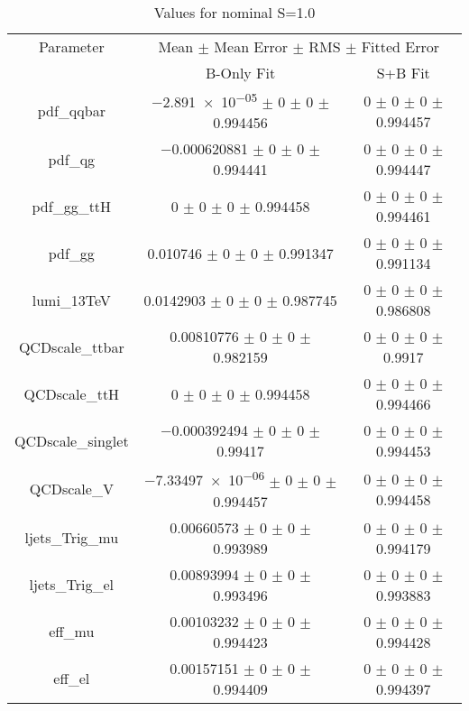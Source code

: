 \begin{table}
\centering
\caption{Values for nominal S=1.0}
\begin{tabular}{ccc}
\toprule
Parameter & \multicolumn{2}{c}{Mean $\pm$ Mean Error $\pm$ RMS $\pm$ Fitted Error}\\
 & B-Only Fit & S+B Fit\\
\midrule
pdf\_qqbar & \num{-2.891e-05} $\pm$ \num{0} $\pm$ \num{0} $\pm$ \num{0.994456} & \num{0} $\pm$ \num{0} $\pm$ \num{0} $\pm$ \num{0.994457}\\
pdf\_qg & \num{-0.000620881} $\pm$ \num{0} $\pm$ \num{0} $\pm$ \num{0.994441} & \num{0} $\pm$ \num{0} $\pm$ \num{0} $\pm$ \num{0.994447}\\
pdf\_gg\_ttH & \num{0} $\pm$ \num{0} $\pm$ \num{0} $\pm$ \num{0.994458} & \num{0} $\pm$ \num{0} $\pm$ \num{0} $\pm$ \num{0.994461}\\
pdf\_gg & \num{0.010746} $\pm$ \num{0} $\pm$ \num{0} $\pm$ \num{0.991347} & \num{0} $\pm$ \num{0} $\pm$ \num{0} $\pm$ \num{0.991134}\\
lumi\_13TeV & \num{0.0142903} $\pm$ \num{0} $\pm$ \num{0} $\pm$ \num{0.987745} & \num{0} $\pm$ \num{0} $\pm$ \num{0} $\pm$ \num{0.986808}\\
QCDscale\_ttbar & \num{0.00810776} $\pm$ \num{0} $\pm$ \num{0} $\pm$ \num{0.982159} & \num{0} $\pm$ \num{0} $\pm$ \num{0} $\pm$ \num{0.9917}\\
QCDscale\_ttH & \num{0} $\pm$ \num{0} $\pm$ \num{0} $\pm$ \num{0.994458} & \num{0} $\pm$ \num{0} $\pm$ \num{0} $\pm$ \num{0.994466}\\
QCDscale\_singlet & \num{-0.000392494} $\pm$ \num{0} $\pm$ \num{0} $\pm$ \num{0.99417} & \num{0} $\pm$ \num{0} $\pm$ \num{0} $\pm$ \num{0.994453}\\
QCDscale\_V & \num{-7.33497e-06} $\pm$ \num{0} $\pm$ \num{0} $\pm$ \num{0.994457} & \num{0} $\pm$ \num{0} $\pm$ \num{0} $\pm$ \num{0.994458}\\
ljets\_Trig\_mu & \num{0.00660573} $\pm$ \num{0} $\pm$ \num{0} $\pm$ \num{0.993989} & \num{0} $\pm$ \num{0} $\pm$ \num{0} $\pm$ \num{0.994179}\\
ljets\_Trig\_el & \num{0.00893994} $\pm$ \num{0} $\pm$ \num{0} $\pm$ \num{0.993496} & \num{0} $\pm$ \num{0} $\pm$ \num{0} $\pm$ \num{0.993883}\\
eff\_mu & \num{0.00103232} $\pm$ \num{0} $\pm$ \num{0} $\pm$ \num{0.994423} & \num{0} $\pm$ \num{0} $\pm$ \num{0} $\pm$ \num{0.994428}\\
eff\_el & \num{0.00157151} $\pm$ \num{0} $\pm$ \num{0} $\pm$ \num{0.994409} & \num{0} $\pm$ \num{0} $\pm$ \num{0} $\pm$ \num{0.994397}\\

\end{tabular}
\end{table}
